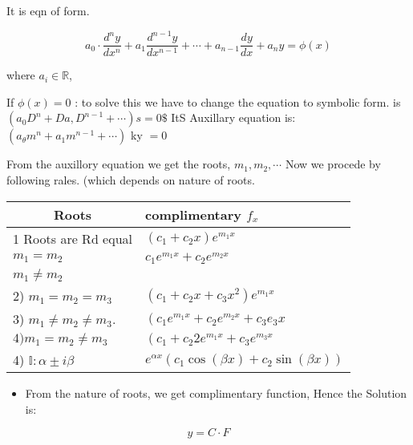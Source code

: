 
It is eqn of form.

$$
	a_{0} \cdot \frac{d^{n} y}{d x^{n}}+a_{1} \frac{d^{n-1} y}{d x^{n-1}}+\cdots+a_{n-1} \frac{d y}{d x}+a_{n} y=\phi(x)
$$

where $a_{i} \in \mathbb{R}$,

If $\phi(x)=0$ : to solve this we have to change the equation to symbolic form. is $\left(a_{0} D^{n}+D a, D^{n-1}+\cdots\right) s=0 \$$ ItS Auxillary equation is: $\left(a_{\theta} m^{n}+a_{1} m^{n-1}+\cdots\right)$ ky $=0$

From the auxillory equation we get the roots, $m_{1}, m_{2}, \cdots$ Now we procede by following rales. (which depends on nature of roots.

\begin{center}
	\begin{tabular}{|l|l|}
		\hline
		\multicolumn{1}{|c|}{Roots}         & complimentary $f_{x}$                                              \\
		\hline
		1 Roots are Rd equal                & $\left(c_{1}+c_{2} x\right) e^{m_{1} x}$                           \\
		$m_{1}=m_{2}$                       & $c_{1} e^{m_{1} x}+c_{2} e^{m_{2} x}$                              \\
		$m_{1} \neq m_{2}$                  &                                                                    \\
		2) $m_{1}=m_{2}=m_{3}$              & $\left(c_{1}+c_{2} x+c_{3} x^2 \right) e^{m_{1} x}$                \\
		3) $m_{1} \neq m_{2} \neq m_{3}$.   & $\left(c_{1} e^{m_{1} x}+c_{2} e^{m_{2} x}+c_{3} e_{3} x\right.$   \\
		$4) m_{1}=m_{2} \neq m_{3}$         & $\left(c_{1}+c_{2} 2 e^{m_{1} x}+c_{3} e^{m_{3} x}\right.$         \\
		4) $\mathbb{I}: \alpha \pm i \beta$ & $e^{\alpha x}\left(c_{1} \cos(\beta x)+c_{2} \sin(\beta x)\right)$ \\
		\hline
	\end{tabular}
\end{center}

\begin{itemize}
	\item From the nature of roots, we get complimentary function, Hence the Solution is:
\end{itemize}

$$
	y=C \cdot F
$$

